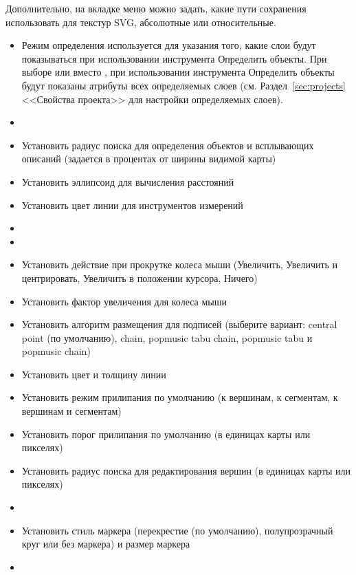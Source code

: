 Дополнительно, на вкладке  меню  \arrow
{} можно задать, какие пути
сохранения использовать для текстур SVG, абсолютные или относительные.


\begin{itemize}
\item Режим определения используется для указания того, какие слои будут
показываться при использовании инструмента Определить объекты. При выборе
 или 
вместо , при использовании инструмента Определить
объекты будут показаны атрибуты всех определяемых слоев (см. Раздел~\ref{sec:projects}
<<Свойства проекта>> для настройки определяемых слоев).
\item {}
\item Установить радиус поиска для определения объектов и всплывающих
описаний (задается в процентах от ширины видимой карты)
\item Установить эллипсоид для вычисления расстояний
\item Установить цвет линии для инструментов измерений
\item {}
\item {}
\item Установить действие при прокрутке колеса мыши (Увеличить, Увеличить
и центрировать, Увеличить в положении курсора, Ничего)
\item Установить фактор увеличения для колеса мыши
\end{itemize}


\begin{itemize}
\item Установить алгоритм размещения для подписей (выберите вариант: central
point (по умолчанию), chain, popmusic tabu chain, popmusic tabu и
popmusic chain)
\end{itemize}


\begin{itemize}
\item Установить цвет и толщину линии
\item Установить режим прилипания по умолчанию (к вершинам, к сегментам,
к вершинам и сегментам)
\item Установить порог прилипания по умолчанию (в единицах карты или
пикселях)
\item Установить радиус поиска для редактирования вершин (в единицах
карты или пикселях)
\item {}
\item Установить стиль маркера (перекрестие (по умолчанию), полупрозрачный
круг или без маркера) и размер маркера
\item {}
\end{itemize}

